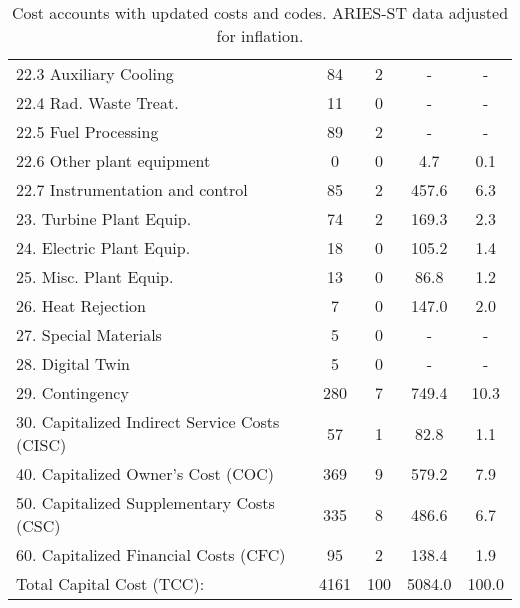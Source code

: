 \begin{table}[h!]
{\begin{tabular}{lcccc}
\hspace{10mm}22.3 Auxiliary Cooling & 84 & 2 & - & - \\
\hspace{10mm}22.4 Rad. Waste Treat. & 11 & 0 & - & - \\
\hspace{10mm}22.5 Fuel Processing & 89 & 2 & - & - \\
\hspace{10mm}22.6 Other plant equipment & 0 & 0 & 4.7 & 0.1 \\
\hspace{10mm}22.7 Instrumentation and control & 85 & 2 & 457.6 & 6.3 \\
\hspace{5mm}23. Turbine Plant Equip. & 74 & 2 & 169.3 & 2.3 \\
\hspace{5mm}24. Electric Plant Equip. & 18 & 0 & 105.2 & 1.4 \\
\hspace{5mm}25. Misc. Plant Equip. & 13 & 0 & 86.8 & 1.2 \\
\hspace{5mm}26. Heat Rejection & 7 & 0 & 147.0 & 2.0 \\
\hspace{5mm}27. Special Materials & 5 & 0 & - & - \\
\hspace{5mm}28. Digital Twin & 5 & 0 & - & - \\
\hspace{5mm}29. Contingency & 280 & 7 & 749.4 & 10.3 \\
30. Capitalized Indirect Service Costs (CISC) & 57 & 1 & 82.8 & 1.1 \\
40. Capitalized Owner’s Cost (COC) & 369 & 9 & 579.2 & 7.9 \\
50. Capitalized Supplementary Costs (CSC) & 335 & 8 & 486.6 & 6.7 \\
60. Capitalized Financial Costs (CFC) & 95 & 2 & 138.4 & 1.9 \\
\hline
Total Capital Cost (TCC): & 4161 & 100 & 5084.0 & 100.0 \\
\hline
\end{tabular}
}
\caption{Cost accounts with updated costs and codes. ARIES-ST data adjusted for inflation.}
\label{tab:costs_updated_codes}
\end{table}


